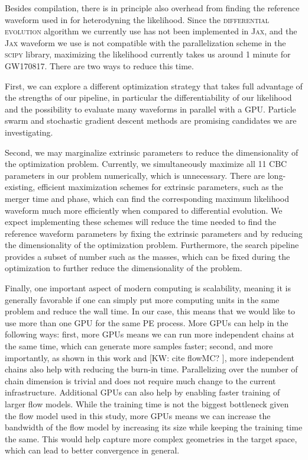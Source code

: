 \documentclass[twocolumn]{aastex631}
\newcommand{\kw}[1]{{\color{rb4}[KW: #1 ]}}
\begin{document}
Besides compilation, there is in principle also overhead from finding the
reference waveform used in for heterodyning the likelihood. Since the
\textsc{differential evolution} algorithm we currently use has not been
implemented in \textsc{Jax}, and the \textsc{Jax} waveform we use is not
compatible with the parallelization scheme in the \textsc{scipy} library,
maximizing the likelihood currently takes us around 1 minute for GW170817. There
are two ways to reduce this time.

First, we can explore a different optimization strategy that
takes full advantage of the strengths of our pipeline, in particular the
differentiability of our likelihood and the possibility to evaluate many
waveforms in parallel with a GPU. Particle swarm \cite{7869491} and stochastic
gradient descent methods \cite{10.5555/304710.304720} are promising candidates
we are investigating.

Second, we may marginalize extrinsic parameters to reduce the dimensionality of
the optimization problem. Currently, we simultaneously maximize all 11 CBC
parameters in our problem numerically, which is unnecessary. There are
long-existing, efficient maximization schemes for extrinsic parameters, such as
the merger time and phase, which can find the corresponding maximum likelihood
waveform much more efficiently when compared to differential evolution. We
expect implementing these schemes will reduce the time needed to find the
reference waveform parameters by fixing the extrinsic parameters and by reducing
the dimensionality of the optimization problem. Furthermore, the search pipeline
provides a subset of number such as the masses, which can be fixed during the
optimization to further reduce the dimensionality of the problem.

Finally, one important aspect of modern computing is scalability, meaning it is
generally favorable if one can simply put more computing units in the same
problem and reduce the wall time. In our case, this means that we would like to
use more than one GPU for the same PE process. More GPUs can help in the
following ways: first, more GPUs means we can run more independent chains at
the same time, which can generate more samples faster; second, and more
importantly, as shown in this work and \kw{cite flowMC?}, more independent
chains also help with reducing the burn-in time. Parallelizing over the number
of chain dimension is trivial and does not require much change to the current
infrastructure. Additional GPUs can also help by enabling faster training of
larger flow models. While the training time is not the biggest bottleneck given
the flow model used in this study, more GPUs means we can increase the
bandwidth of the flow model by increasing its size while keeping the training
time the same. This would help capture more complex geometries in the target
space, which can lead to better convergence in general.
\end{document}
